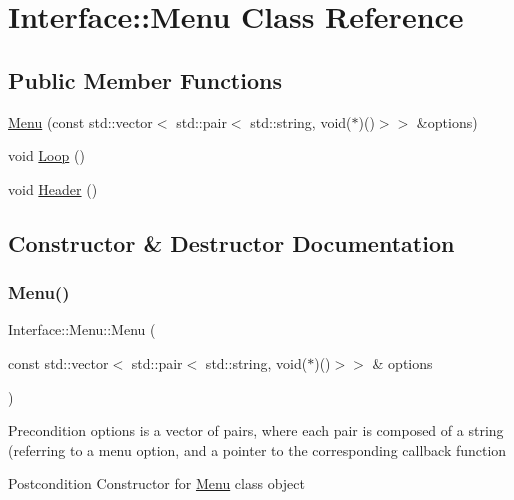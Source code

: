 \hypertarget{class_interface_1_1_menu}{}\section{Interface\+:\+:Menu Class Reference}
\label{class_interface_1_1_menu}
\subsection*{Public Member Functions}
\begin{DoxyCompactItemize}
\item 
\mbox{\hyperlink{class_interface_1_1_menu_ad9d0ce403f0ad96df24bcde018030650}{Menu}} (const std\+::vector$<$ std\+::pair$<$ std\+::string, void($\ast$)()$>$$>$ \&options)
\item 
void \mbox{\hyperlink{class_interface_1_1_menu_ac6e7791ff9ffb233d07e05653a4f5bb2}{Loop}} ()
\item 
void \mbox{\hyperlink{class_interface_1_1_menu_ac9c262f57118f3b3043bed327f195c00}{Header}} ()
\end{DoxyCompactItemize}


\subsection{Constructor \& Destructor Documentation}
\mbox{\label{class_interface_1_1_menu_ad9d0ce403f0ad96df24bcde018030650}} 
\subsubsection{\texorpdfstring{Menu()}{Menu()}}
{\footnotesize\ttfamily Interface\+::\+Menu\+::\+Menu (\begin{DoxyParamCaption}\item[{const std\+::vector$<$ std\+::pair$<$ std\+::string, void($\ast$)()$>$$>$ \&}]{options }\end{DoxyParamCaption})}

\begin{DoxyPrecond}{Precondition}
options is a vector of pairs, where each pair is composed of a string (referring to a menu option, and a pointer to the corresponding callback function 
\end{DoxyPrecond}
\begin{DoxyPostcond}{Postcondition}
Constructor for \mbox{\hyperlink{class_interface_1_1_menu}{Menu}} class object 
\end{DoxyPostcond}


